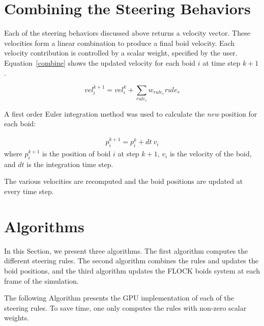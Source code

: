 \section{Combining the Steering Behaviors}
Each of the steering behaviors discussed above returns a velocity vector. These velocities form a linear combination to produce a final boid velocity. Each velocity contribution is controlled by a scalar weight, specified by the user. Equation~\ref{combine} shows the updated velocity for each boid $i$ at time step $k+1$.

\begin{equation}
\label{combine}
vel_i^{k+1} = vel_i^{k} + \sum_{rule_r} w_{rule_r} {rule_r} 
\end{equation}

A first order Euler integration method was used  to calculate the \textit{new} position for each boid: 

\begin{align}
\label{integrate}
p_i^{k+1} = p_i^k + dt~ v_i
\end{align}
where $p_i^{k+1}$ is the position of boid $i$ at step $k+1$, $v_i$ is the velocity of the boid, and $dt$ is the integration time step. 

The various velocities are recomputed and the boid positions are updated at every time step. 

\section{Algorithms}

In this Section, we present three algorithms. The first algorithm computes the different steering rules. The second algorithm combines the rules and updates the boid positions, and the third algorithm updates the FLOCK boids system at each frame of the simulation. 

The following Algorithm presents the GPU implementation of each of the steering rules. To save time, one only computes the rules with non-zero scalar weights. 

